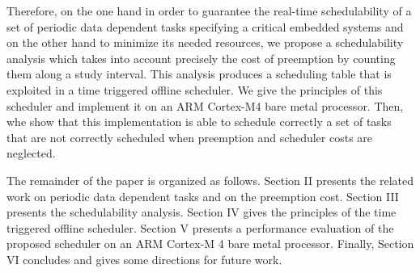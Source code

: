 \documentclass[conference,compsocconf]{IEEEtran}
\begin{document}
Therefore, on the one hand in order to guarantee the real-time schedulability
of a set of periodic data dependent tasks specifying a critical embedded
systems and on the other hand to minimize its needed resources, we propose a
schedulability analysis which takes into account precisely the cost of
preemption by counting them along a study interval. This analysis produces a
scheduling table that is exploited in a time triggered offline scheduler. We
give the principles of this scheduler and
implement it on an ARM Cortex-M4 bare metal processor. Then, whe show that this
implementation is able to schedule correctly a set of tasks that are not
correctly scheduled when preemption and scheduler costs are neglected.

The remainder of the paper is organized as follows. Section II presents the
related work on periodic data dependent tasks and on the preemption cost.
Section III presents the schedulability analysis. Section IV gives the
principles of the time triggered offline scheduler. Section V presents a
performance evaluation of the proposed scheduler on an ARM Cortex-M 4 bare
metal processor. Finally, Section VI concludes and gives some directions for
future work.
\end{document}
